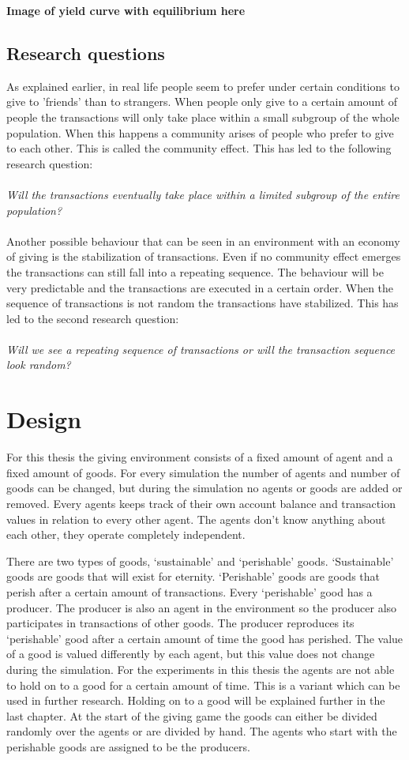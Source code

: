 \documentclass[twoside,openright]{uva-bachelor-thesis}
\begin{document}
\textbf{Image of yield curve with equilibrium here}

\section{Research questions}
As explained earlier, in real life people seem to prefer under certain conditions to give to 'friends' than to strangers. When people only give to a certain amount of people the transactions will only take place within a small subgroup of the whole population. When this happens a community arises of people who prefer to give to each other. This is called the community effect. This has led to the following research question:
\\
\\
\textit{Will the transactions eventually take place within a limited subgroup of the entire population?}
\\
\\
Another possible behaviour that can be seen in an environment with an economy of giving is the stabilization of transactions. Even if no community effect emerges the transactions can still fall into a repeating sequence. The behaviour will be very predictable and the transactions are executed in a certain order. When the sequence of transactions is not random the transactions have stabilized. This has led to the second research question:
\\
\\
\textit{Will we see a repeating sequence of transactions or will the transaction sequence look random?}


\chapter{Design}
For this thesis the giving environment consists of a fixed amount of agent and a fixed amount of goods. For every simulation the number of agents and number of goods can be changed, but during the simulation no agents or goods are added or removed.  Every agents keeps track of their own account balance and transaction values in relation to every other agent. The agents don’t know anything about each other, they operate completely independent.

There are two types of goods, ‘sustainable’ and ‘perishable’ goods. ‘Sustainable’ goods are goods that will exist for eternity. ‘Perishable’ goods are goods that perish after a certain amount of transactions. Every ‘perishable’ good has a producer. The producer is also an agent in the environment so the producer also participates in transactions of other goods. The producer reproduces its ‘perishable’ good after a certain amount of time the good has perished. The value of a good is valued differently by each agent, but this value does not change during the simulation. For the experiments in this thesis the agents are not able to hold on to a good for a certain amount of time. This is a variant which can be used in further research. Holding on to a good will be explained further in the last chapter. At the start of the giving game the goods can either be divided randomly over the agents or are divided by hand. The agents who start with the perishable goods are assigned to be the producers.
\end{document}
